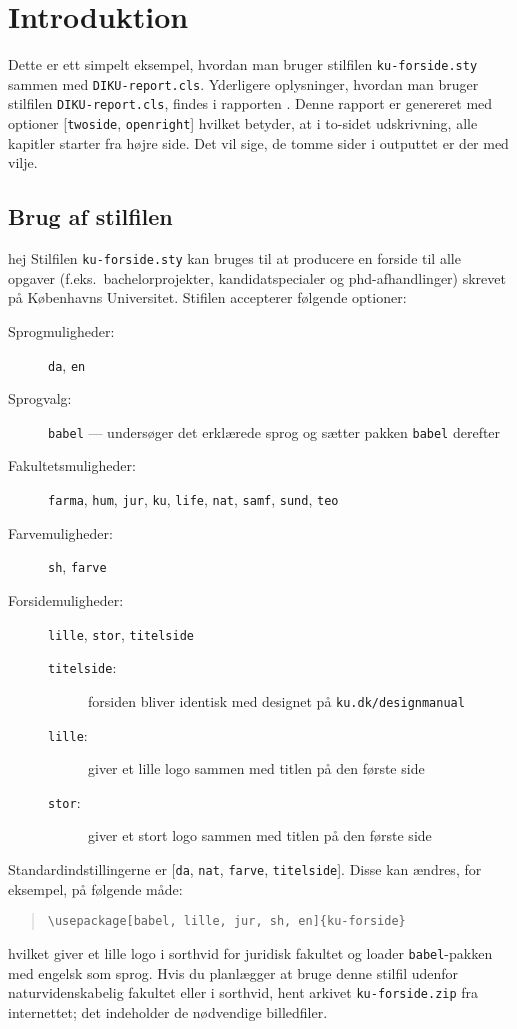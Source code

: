 \chapter*{Introduktion}
%

Dette er ett simpelt eksempel, hvordan man bruger stilfilen
\verb|ku-forside.sty| sammen med \verb|DIKU-report.cls|.  Yderligere
oplysninger, hvordan man bruger stilfilen \verb|DIKU-report.cls|,
findes i rapporten \cite{KR14}. Denne rapport er genereret med
optioner [\verb|twoside|, \verb|openright|] hvilket betyder, at i
to-sidet udskrivning, alle kapitler starter fra højre side. Det vil
sige, de tomme sider i outputtet er der med vilje.

\section*{Brug af stilfilen}

hej Stilfilen \verb|ku-forside.sty| kan bruges til at producere en forside
til alle opgaver (f.eks.~bachelorprojekter, kandidatspecialer og
phd-afhandlinger) skrevet på Københavns Universitet.  Stifilen
accepterer følgende optioner:
\begin{description}
\item[Sprogmuligheder:]  \texttt{da}, \texttt{en}
\item[Sprogvalg:] \verb|babel| --- undersøger det erklærede sprog og sætter pakken \verb|babel| derefter
\item[Fakultetsmuligheder:] \verb|farma|, \verb|hum|, \verb|jur|, \verb|ku|, \verb|life|, \verb|nat|, \verb|samf|, \verb|sund|, \verb|teo|
\item[Farvemuligheder:] \verb|sh|,  \verb|farve|
\item[Forsidemuligheder:] \verb|lille|, \verb|stor|, \verb|titelside|
\begin{description}
\item[\texttt{titelside}:] forsiden bliver identisk med designet på
  \texttt{ku.dk/designmanual}
\item[\texttt{lille}:] giver et lille logo sammen med titlen på den første side
\item[\texttt{stor}:] giver et stort logo sammen med titlen på den første side
\end{description}
\end{description}

Standardindstillingerne er [\verb|da|, \verb|nat|, \verb|farve|,
  \verb|titelside|].  Disse kan ændres, for eksempel, på følgende
måde:
\begin{quotation}
\verb|\usepackage[babel, lille, jur, sh, en]{ku-forside}|
\end{quotation}
hvilket giver et lille logo i sorthvid for juridisk fakultet og loader
\verb|babel|-pakken med engelsk som sprog.  Hvis du planlægger at bruge denne
stilfil udenfor naturvidenskabelig fakultet eller i sorthvid, hent
arkivet \verb|ku-forside.zip| fra internettet; det indeholder de
nødvendige billedfiler.
